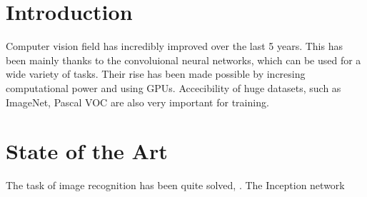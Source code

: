 \documentclass[a4paper,12pt,titlepage, twoside]{article}
\begin{document}
\section{Introduction}

Computer vision field has incredibly improved over the last 5 years. This has been mainly thanks to the convoluional neural networks, which can be used for a wide variety of tasks. Their rise has been made possible by incresing computational power and using GPUs. Accecibility of huge datasets, such as ImageNet\cite{imagenet}, Pascal VOC \cite{pascal} are also very important for training. 


\section{State of the Art}
The task of image recognition has been quite solved, . The Inception network \cite{inception}




{}
\cleardoublepage
\clearpage
\end{document}

